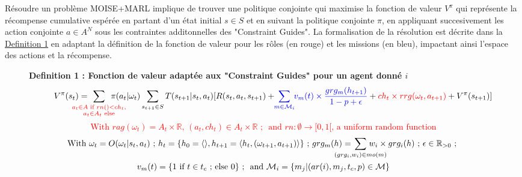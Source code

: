 \documentclass[sigconf,anonymous]{aamas}
\begin{document}
Résoudre un problème MOISE+MARL implique de trouver une politique conjointe qui maximise la fonction de valeur $V^\pi$ qui représente la récompense cumulative espérée en partant d'un état initial $s \in S$ et en suivant la politique conjointe $\pi$, en appliquant succesivement les action conjointe $a \in A^N$ sous les contraintes additonnelles des "Constraint Guides". La formalisation de la résolution est décrite dans la \hyperref[eq:value_function]{Definition 1} en adaptant la définition de la fonction de valeur pour les rôles (en rouge) et les missions (en bleu), impactant ainsi l'espace des actions et la récompense.


\begin{figure*}[h!]
  \label{eq:value_function}
  \raggedright
  \textbf{Definition 1 : Fonction de valeur adaptée aux "Constraint Guides" pour un agent donné $i$}
  \begin{gather*}
    \text{ \quad \quad}V^\pi(s_t) = \hspace{-0.75cm} \sum_{\textcolor{red}{ \substack{a_{t} \in A \text{ if } rn() < ch_{t}, \\ 
    a_{t} \in A_{t} \text{ else}}
    }}{\hspace{-0.7cm} \pi(a_{t} | \omega_t)} \sum_{s_{t+1} \in S}{T(s_{t+1} | s_t, a_{t})[R(s_t,a_{t},s_{t+1}) + \hspace{-0.1cm} \textcolor{blue}{ \sum_{m \in \mathcal{M}_i}{ \hspace{-0.1cm} v_m(t) \times \frac{grg_m(h_{t+1})}{1 - p + \epsilon} } } + \textcolor{red}{ch_t \times rrg(\omega_t,a_{t+1})} + V^{\pi}(s_{t+1})]}
  \end{gather*}  
  \textcolor{red}{\[\text{With } rag(\omega_t) = A_{t} \times \mathbb{R} \text{, } (a_t, ch_{t}) \in A_{t} \times \mathbb{R} \text{ ; } \text{ and } rn: \emptyset \to [0,1[ \text{, a uniform random function}\]}
  \textcolor{blue}{
  \begin{gather*}
  \text{With } \omega_t = O(\omega_t | s_t, a_t) \text{ ; } h_t = \{h_0 = \langle \rangle, h_{t+1} = \langle h_t, (\omega_{t+1}, a_{t+1}) \rangle \} \text{ ; } grg_m(h) = \hspace{-0.8cm} \sum_{(grg_i,w_i) \in mo(m)}{\hspace{-0.8cm} w_i \times grg_i(h)} \text{ ; } \epsilon \in \mathbb{R}_{>0} \text{ ; } \\
  v_m(t) = \{ 1 \text{ if } t \in t_c \text{ ; else } 0 \} \text{ ; } \text{ and } \mathcal{M}_i = \{m_j | (ar(i),m_j,t_c,p) \in \mathcal{M}\}
  \end{gather*}
  }

  \end{figure*}
\end{document}
